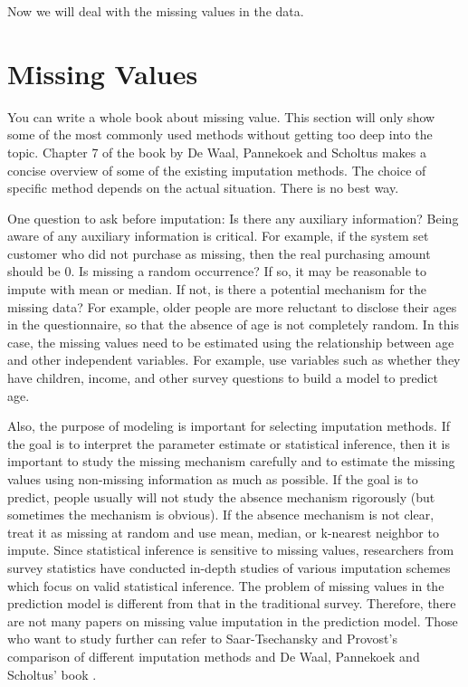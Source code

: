 \documentclass[12pt,]{krantz}
\theoremstyle{definition}
\theoremstyle{definition}
\theoremstyle{definition}
\theoremstyle{remark}
\begin{document}
Now we will deal with the missing values in the data.

\section{Missing Values}\label{missing-values}

You can write a whole book about missing value. This section will only
show some of the most commonly used methods without getting too deep
into the topic. Chapter 7 of the book by De Waal, Pannekoek and Scholtus
\citep{Ton2011} makes a concise overview of some of the existing
imputation methods. The choice of specific method depends on the actual
situation. There is no best way.

One question to ask before imputation: Is there any auxiliary
information? Being aware of any auxiliary information is critical. For
example, if the system set customer who did not purchase as missing,
then the real purchasing amount should be 0. Is missing a random
occurrence? If so, it may be reasonable to impute with mean or median.
If not, is there a potential mechanism for the missing data? For
example, older people are more reluctant to disclose their ages in the
questionnaire, so that the absence of age is not completely random. In
this case, the missing values need to be estimated using the
relationship between age and other independent variables. For example,
use variables such as whether they have children, income, and other
survey questions to build a model to predict age.

Also, the purpose of modeling is important for selecting imputation
methods. If the goal is to interpret the parameter estimate or
statistical inference, then it is important to study the missing
mechanism carefully and to estimate the missing values using non-missing
information as much as possible. If the goal is to predict, people
usually will not study the absence mechanism rigorously (but sometimes
the mechanism is obvious). If the absence mechanism is not clear, treat
it as missing at random and use mean, median, or k-nearest neighbor to
impute. Since statistical inference is sensitive to missing values,
researchers from survey statistics have conducted in-depth studies of
various imputation schemes which focus on valid statistical inference.
The problem of missing values in the prediction model is different from
that in the traditional survey. Therefore, there are not many papers on
missing value imputation in the prediction model. Those who want to
study further can refer to Saar-Tsechansky and Provost's comparison of
different imputation methods \citep{missing1} and De Waal, Pannekoek and
Scholtus' book \citep{Ton2011}.
\end{document}
